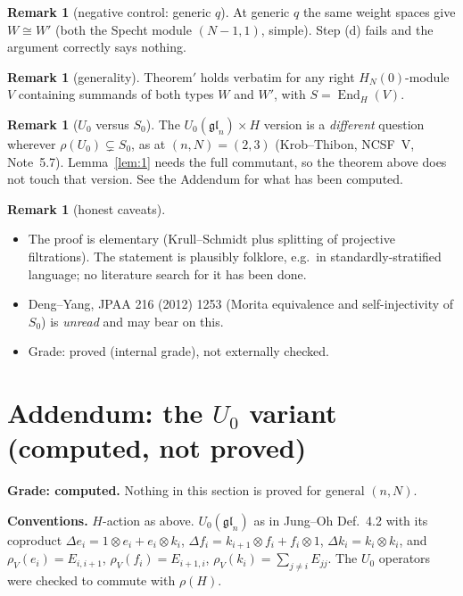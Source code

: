 \documentclass[11pt]{amsart}
\newcommand{\End}{\operatorname{End}}
\theoremstyle{plain}
\theoremstyle{definition}
\newtheorem{remark}[theorem]{Remark}
\begin{document}
\begin{remark}[negative control: generic $q$]
At generic $q$ the same weight spaces give $W\cong W'$ (both the Specht module $(N-1,1)$, simple). Step (d) fails and the argument correctly says nothing.
\end{remark}

\begin{remark}[generality]
Theorem$'$ holds verbatim for any right $H_N(0)$-module $V$ containing summands of both types $W$ and $W'$, with $S=\End_H(V)$.
\end{remark}

\begin{remark}[$U_0$ versus $S_0$]
The $U_0(\mathfrak{gl}_n)\times H$ version is a \emph{different} question wherever $\rho(U_0)\subsetneq S_0$, as at $(n,N)=(2,3)$ (Krob--Thibon, NCSF~V, Note~5.7). Lemma~\ref{lem:1} needs the full commutant, so the theorem above does not touch that version. See the Addendum for what has been computed.
\end{remark}

\begin{remark}[honest caveats]
\leavevmode
\begin{itemize}[leftmargin=*,itemsep=1pt]
\item The proof is elementary (Krull--Schmidt plus splitting of projective filtrations). The statement is plausibly folklore, e.g.\ in standardly-stratified language; no literature search for it has been done.
\item Deng--Yang, JPAA 216 (2012) 1253 (Morita equivalence and self-injectivity of $S_0$) is \emph{unread} and may bear on this.
\item Grade: proved (internal grade), not externally checked.
\end{itemize}
\end{remark}

\section{Addendum: the $U_0$ variant (computed, not proved)}

\noindent\textbf{Grade: computed.} Nothing in this section is proved for general $(n,N)$.

\smallskip
\noindent\textbf{Conventions.} $H$-action as above. $U_0(\mathfrak{gl}_n)$ as in Jung--Oh Def.~4.2 with its coproduct $\Delta e_i=1\otimes e_i+e_i\otimes k_i$, $\Delta f_i=k_{i+1}\otimes f_i+f_i\otimes1$, $\Delta k_i=k_i\otimes k_i$, and $\rho_V(e_i)=E_{i,i+1}$, $\rho_V(f_i)=E_{i+1,i}$, $\rho_V(k_i)=\sum_{j\ne i}E_{jj}$. The $U_0$ operators were checked to commute with $\rho(H)$.
\end{document}
